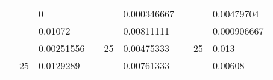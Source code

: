 \begin{table}[H]
\begin{tabular}{|cclcclccc}
\rowcolor[HTML]{DAE8FC} 
\multicolumn{1}{|c|}{\cellcolor[HTML]{FFFFC7}}                                & \multicolumn{1}{c|}{\cellcolor[HTML]{DAE8FC}}                      & \multicolumn{1}{l|}{\cellcolor[HTML]{DAE8FC}0}           & \multicolumn{1}{c|}{\cellcolor[HTML]{FFFFC7}}                                & \multicolumn{1}{c|}{\cellcolor[HTML]{DAE8FC}}                       & \multicolumn{1}{l|}{\cellcolor[HTML]{DAE8FC}0.000346667} & \multicolumn{1}{c|}{\cellcolor[HTML]{FFFFC7}}                                & \multicolumn{1}{c|}{\cellcolor[HTML]{DAE8FC}}                      & \multicolumn{1}{l|}{\cellcolor[HTML]{DAE8FC}0.00479704}  \\ \cline{3-3} \cline{6-6} \cline{9-9} 
\multicolumn{1}{|c|}{\cellcolor[HTML]{FFFFC7}}                                & \multicolumn{1}{c|}{\cellcolor[HTML]{DAE8FC}}                      & \multicolumn{1}{l|}{\cellcolor[HTML]{DDFDFF}0.01072}     & \multicolumn{1}{c|}{\cellcolor[HTML]{FFFFC7}}                                & \multicolumn{1}{c|}{\cellcolor[HTML]{DAE8FC}}                       & \multicolumn{1}{l|}{\cellcolor[HTML]{DDFDFF}0.00811111}  & \multicolumn{1}{c|}{\cellcolor[HTML]{FFFFC7}}                                & \multicolumn{1}{c|}{\cellcolor[HTML]{DAE8FC}}                      & \multicolumn{1}{l|}{\cellcolor[HTML]{DDFDFF}0.000906667} \\ \cline{3-3} \cline{6-6} \cline{9-9} 
\rowcolor[HTML]{DAE8FC} 
\multicolumn{1}{|c|}{\cellcolor[HTML]{FFFFC7}}                                & \multicolumn{1}{c|}{\cellcolor[HTML]{DAE8FC}}                      & \multicolumn{1}{l|}{\cellcolor[HTML]{DAE8FC}0.00251556}  & \multicolumn{1}{c|}{\cellcolor[HTML]{FFFFC7}}                                & \multicolumn{1}{c|}{\multirow{-9}{*}{\cellcolor[HTML]{DAE8FC}25}}   & \multicolumn{1}{l|}{\cellcolor[HTML]{DAE8FC}0.00475333}  & \multicolumn{1}{c|}{\cellcolor[HTML]{FFFFC7}}                                & \multicolumn{1}{c|}{\multirow{-9}{*}{\cellcolor[HTML]{DAE8FC}25}}  & \multicolumn{1}{l|}{\cellcolor[HTML]{DAE8FC}0.013}       \\ \cline{3-3} \cline{5-6} \cline{8-9} 
\multicolumn{1}{|c|}{\cellcolor[HTML]{FFFFC7}}                                & \multicolumn{1}{c|}{\multirow{-10}{*}{\cellcolor[HTML]{DAE8FC}25}} & \multicolumn{1}{l|}{\cellcolor[HTML]{DDFDFF}0.0129289}   & \multicolumn{1}{c|}{\cellcolor[HTML]{FFFFC7}}                                & \multicolumn{1}{c|}{\cellcolor[HTML]{DDFDFF}}                       & \multicolumn{1}{l|}{\cellcolor[HTML]{DAE8FC}0.00761333}  & \multicolumn{1}{c|}{\cellcolor[HTML]{FFFFC7}}                                & \multicolumn{1}{c|}{\cellcolor[HTML]{DDFDFF}}                      & \multicolumn{1}{l|}{\cellcolor[HTML]{DAE8FC}0.00608}     \\ \cline{2-3} \cline{6-6} \cline{9-9} 

\end{tabular}
\end{table}
